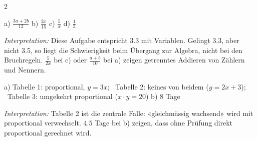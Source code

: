 \documentclass[11pt]{exam}
\newcommand{\aufgabe}[1]{%
  \needspace{8\baselineskip}%
  \renewcommand{\questionlabel}{\textbf{#1}}%
  \question}
\newcommand{\raum}[1]{\ifprintanswers\else\fillwithgrid{#1}\fi}
\newcommand{\diagnose}[1]{\par\smallskip\textit{Interpretation:} #1}
\begin{document}
\begin{questions}
\begin{multicols}{2}
\end{multicols}
\begin{solution}
  a) $\frac{3a + 2b}{12}$ \quad b) $\frac{2x}{15}$ \quad c) $\frac{5}{x}$ \quad
  d) $\frac{1}{3}$
  \diagnose{Diese Aufgabe entspricht 3.3 mit Variablen. Gelingt 3.3, aber nicht
  3.5, so liegt die Schwierigkeit beim Übergang zur Algebra, nicht bei den
  Bruchregeln. $\frac{5}{2x}$ bei c) oder $\frac{a+b}{10}$ bei a) zeigen
  getrenntes Addieren von Zählern und Nennern.}
\end{solution}
\raum{4cm}

\aufgabe{4.5}
\begin{solution}
  a) Tabelle 1: proportional, $y = 3x$; \ Tabelle 2: keines von beidem
  ($y = 2x + 3$); \ Tabelle 3: umgekehrt proportional ($x \cdot y = 20$)
  \qquad b) $8$ Tage
  \diagnose{Tabelle 2 ist die zentrale Falle: «gleichmässig wachsend» wird mit
  proportional verwechselt. $4.5$ Tage bei b) zeigen, dass ohne Prüfung direkt
  proportional gerechnet wird.}
\end{solution}
\raum{3.5cm}


\end{questions}
\end{document}
